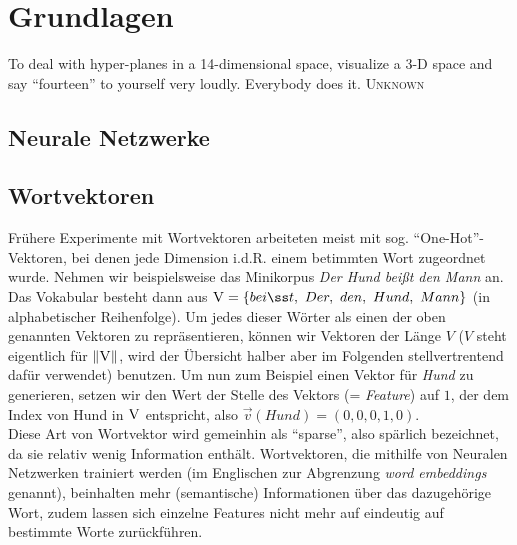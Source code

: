 
\chapter{Grundlagen} %

\label{Chapter3} %


\begin{itquote}
To deal with hyper-planes in a 14-dimensional space, visualize a 3-D space and say ``fourteen'' to yourself
very loudly. Everybody does it.
\flushright
\textsc{Unknown}
\end{itquote}

\section{Neurale Netzwerke}



\section{Wortvektoren}

Frühere Experimente mit Wortvektoren arbeiteten meist mit sog. ``One-Hot''-Vektoren, bei denen jede Dimension i.d.R.
einem betimmten Wort zugeordnet wurde. Nehmen wir beispielsweise das Minikorpus \emph{Der Hund beißt den Mann} an.
Das Vokabular besteht dann aus $\textsc{V} = \{bei{\ss}t,\ Der,\ den,\ Hund,\ Mann\}$ (in alphabetischer Reihenfolge).
Um jedes dieser Wörter als einen der oben genannten Vektoren zu repräsentieren, können wir Vektoren der Länge $V$
($V$ steht eigentlich für $\|\textsc{V}\|$, wird der Übersicht halber aber im Folgenden stellvertrentend dafür verwendet)
benutzen. Um nun zum Beispiel einen Vektor für \emph{Hund} zu generieren, setzen wir den Wert der Stelle des Vektors (=
\emph{Feature}) auf $1$, der dem Index von Hund in $\textsc{V}$ entspricht,
also $\vec{v}(Hund)=(0, 0, 0, 1, 0)$.\\
Diese Art von Wortvektor wird gemeinhin als ``sparse'', also spärlich bezeichnet, da sie relativ wenig Information enthält.
Wortvektoren, die mithilfe von Neuralen Netzwerken trainiert werden (im Englischen zur Abgrenzung \emph{word embeddings}
genannt), beinhalten mehr (semantische) Informationen über das dazugehörige Wort, zudem lassen sich einzelne Features
nicht mehr auf eindeutig auf bestimmte Worte zurückführen.\\

